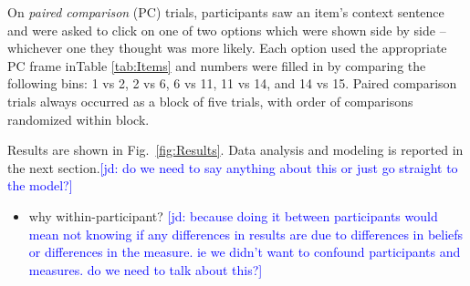 \documentclass[10pt,letterpaper]{article}
\newcommand{\jd}[1]{\textcolor{Blue}{[jd: #1]}}
\newcommand{\tableref}[1]{Table \ref{#1}}
\newcommand{\figref}[1]{Fig.~\ref{#1}}
\begin{document}
On \emph{paired comparison} (PC) trials, participants  saw an item's context sentence and were asked to click on one of two options which were shown side by side -- whichever one they thought was more likely.  Each option used the appropriate PC frame in\tableref{tab:Items} and numbers were filled in by comparing the following bins: 1 vs 2, 2 vs 6, 6 vs 11, 11 vs 14, and 14 vs 15. Paired comparison trials always occurred as a block of five trials, with order of comparisons randomized within block.


Results are shown in \figref{fig:Results}. Data analysis and modeling is reported in the next section.\jd{do we need to say anything about this or just go straight to the model?}

\begin{itemize}
\item why within-participant? \jd{because doing it between participants would mean not knowing if any differences in results are due to differences in beliefs or differences in the measure. ie we didn't want to confound participants and measures. do we need to talk about this?}

\end{itemize}
\end{document}
